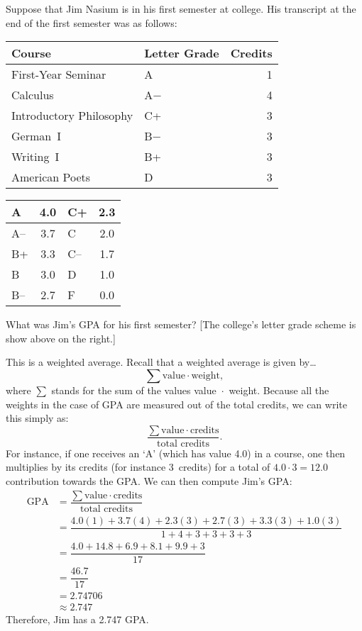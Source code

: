 \documentclass[11pt,letterpaper]{article}
\begin{document}
 Suppose that Jim Nasium is in his first semester at college. His transcript at the end of the first semester was as follows: \par
	\begin{table}[!ht]
	\centering
	\begin{tabular}{llr}
	Course & Letter Grade & Credits \\ \hline
	First-Year Seminar & A & 1 \\
	Calculus & A$-$ & 4 \\
	Introductory Philosophy & C+ & 3 \\
	German~I & B$-$ & 3 \\
	Writing~I & B+ & 3 \\
	American Poets & D & 3
	\end{tabular} \hspace{1cm}
        \begin{tabular}{|l||c|l||c|} \hline
        A & 4.0 & C+ & 2.3 \\ \hline
        A-- & 3.7 & C & 2.0 \\ \hline
        B+ & 3.3 & C-- & 1.7 \\ \hline
        B & 3.0 & D & 1.0 \\ \hline
        B-- & 2.7 & F & 0.0 \\ \hline
        \end{tabular}
	\end{table} \par
What was Jim's GPA for his first semester? [The college's letter grade scheme is show above on the right.] \pspace

\sol This is a weighted average. Recall that a weighted average is given by\dots \pspace
	\[
	\sum \text{value} \cdot \text{weight},
	\] \pspace
where $\sum$ stands for the sum of the values value~$\cdot$~weight. Because all the weights in the case of GPA are measured out of the total credits, we can write this simply as: \pspace
	\[
	\dfrac{\sum \text{value} \cdot \text{credits}}{\text{total credits}}.
	\] \pspace
For instance, if one receives an `A' (which has value 4.0) in a course, one then multiplies by its credits (for instance 3~credits) for a total of $4.0 \cdot 3= 12.0$ contribution towards the GPA. We can then compute Jim's GPA: \pspace
	\[
	\begin{aligned}
	\text{GPA}&= \dfrac{\sum \text{value} \cdot \text{credits}}{\text{total credits}} \\[0.3cm]
	&= \dfrac{4.0(1) + 3.7(4) + 2.3(3) + 2.7(3) + 3.3(3) + 1.0(3)}{1 + 4 + 3 + 3 + 3 + 3} \\[0.3cm]
	&= \dfrac{4.0 + 14.8 + 6.9 + 8.1 + 9.9 + 3}{17} \\[0.3cm]
	&= \dfrac{46.7}{17} \\[0.3cm]
	&= 2.74706 \\[0.3cm]
	&\approx 2.747
	\end{aligned}
	\] \pspace
Therefore, Jim has a 2.747 GPA. 
\end{document}
